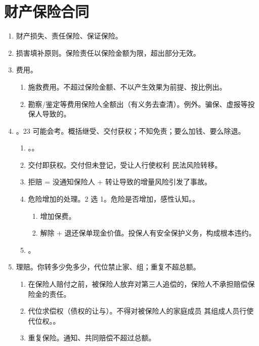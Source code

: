 \section{财产保险合同}
\begin{enumerate}
  \item 财产损失、责任保险、保证保险。
  \item 损害填补原则。保险责任以保险金额为限，超出部分无效。
  \item 费用。
        \begin{enumerate}
          \item 施救费用。不超过保险金额、不以产生效果为前提、按比例出。
          \item 勘察/鉴定等费用保险人全额出（有义务去查清）。例外。骗保、虚报等投保人导致的。
        \end{enumerate}
  \item {}。23 可能会考。概括继受、交付获权；不知免责；要么加钱、要么除退。
        \begin{enumerate}
          \item {}。。
          \item 交付即获权。交付但未登记，受让人行使权利 \yjt 民法风险转移。
          \item 拒赔 = 没通知保险人 + 转让导致的增量风险引发了事故。
          \item 危险增加的处理。2 选 1。危险是否增加，感性认知。。
                \begin{enumerate}
                  \item 增加保费。
                  \item 解除 + 退还保单现金价值。投保人有安全保护义务，构成根本违约。
                \end{enumerate}
          \item {}。
        \end{enumerate}
  \item 理赔。你转多少免多少，代位禁止家、组；重复不超总额。
        \begin{enumerate}
          \item 在保险人赔付之前，被保险人放弃对第三人追偿的，保险人不承担赔偿保险金的责任。
          \item 代位求偿权（债权的让与）。不得对被保险人的家庭成员 \hz 其组成人员行使代位权。。
          \item 重复保险。通知、共同赔偿不超过总额。

\end{enumerate}
\end{enumerate}
